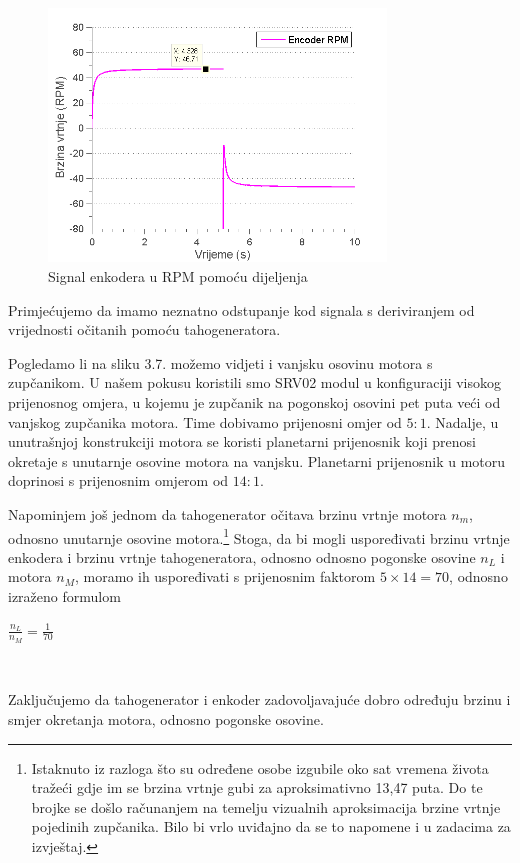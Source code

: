 \documentclass[12pt,a4paper]{article}
\begin{document}
\newpage

\begin{figure}[!t]
	\begin{center}
	\includegraphics[width=0.8\textwidth] {encoderRPM1.png}
    \caption{Signal enkodera u RPM pomoću dijeljenja}
    \end{center}
\end{figure}


Primjećujemo da imamo neznatno odstupanje kod signala s deriviranjem od vrijednosti očitanih pomoću tahogeneratora.

Pogledamo li na sliku 3.7. možemo vidjeti i vanjsku osovinu motora s zupčanikom. U našem pokusu koristili smo SRV02 modul u konfiguraciji visokog prijenosnog omjera, u kojemu je zupčanik na pogonskoj osovini pet puta veći od vanjskog zupčanika motora. Time dobivamo prijenosni omjer od $5:1$. Nadalje, u unutrašnjoj konstrukciji motora se koristi planetarni prijenosnik koji prenosi okretaje s unutarnje osovine motora na vanjsku. Planetarni prijenosnik u motoru doprinosi s prijenosnim omjerom od $14:1$.

Napominjem još jednom da tahogenerator očitava brzinu vrtnje motora $n_m$, odnosno unutarnje osovine motora.\footnote{Istaknuto iz razloga što su određene osobe izgubile oko sat vremena života tražeći gdje im se brzina vrtnje gubi za aproksimativno 13,47 puta. Do te brojke se došlo računanjem na temelju vizualnih aproksimacija brzine vrtnje pojedinih zupčanika. Bilo bi vrlo uviđajno da se to napomene i u zadacima za izvještaj.}
Stoga, da bi mogli uspoređivati brzinu vrtnje enkodera i brzinu vrtnje tahogeneratora, odnosno odnosno pogonske osovine $n_L$ i motora $n_M$, moramo ih uspoređivati s prijenosnim faktorom $5\times14=70$, odnosno izraženo formulom

\begin{center}
$\tfrac{n_L}{n_M} = \tfrac{1}{70}$
\end{center}

\begin{verbatim}


\end{verbatim}
Zaključujemo da tahogenerator i enkoder zadovoljavajuće dobro određuju brzinu i smjer okretanja motora, odnosno pogonske osovine.
\end{document}

